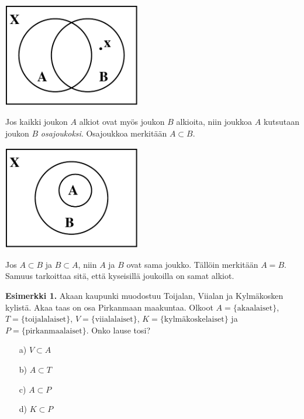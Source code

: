 
\begin{center}
\includegraphics[width=6cm]{kuvat/venn}
\end{center}

Jos kaikki joukon $A$ alkiot ovat myös joukon $B$ alkioita, niin joukkoa $A$ kutsutaan joukon $B$ {\em osajoukoksi}. Osajoukkoa merkitään $A\subset B$. 


\begin{center}
\includegraphics[width=6cm]{kuvat/osajoukko}
\end{center}

Jos $A\subset B$ ja $B\subset A$, niin  $A$ ja $B$ ovat sama joukko. Tällöin merkitään $A=B$. Samuus tarkoittaa sitä, että kyseisillä joukoilla on samat alkiot. %

{\bf Esimerkki 1.}
Akaan kaupunki muodostuu Toijalan, Viialan ja Kylmäkosken
kylistä. Akaa taas on osa Pirkanmaan maakuntaa. Olkoot $A
= \{\textrm{akaalaiset}\}$, $T = \{\textrm{toijalalaiset}\}$, $V
= \{\textrm{viialalaiset}\}$, $K = \{\textrm{kylmäkoskelaiset}\} $ ja $P = \{\textrm{pirkanmaalaiset}\}$. Onko lause tosi?

\begin{itemize}
\item[a)] $V \subset A$
\item[b)] $A \subset T$
\item[c)] $A \subset P$
\item[d)] $K \subset P$
\end{itemize}

